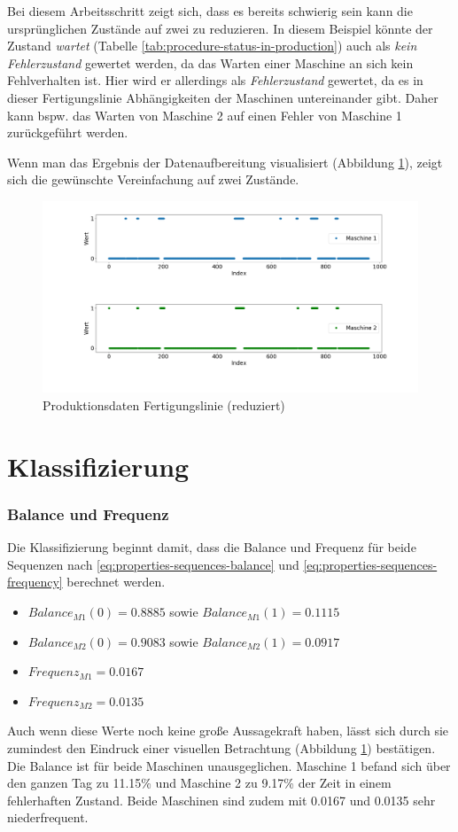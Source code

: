 Bei diesem Arbeitsschritt zeigt sich, dass es bereits schwierig sein kann die ursprünglichen Zustände auf zwei zu reduzieren. In diesem Beispiel könnte der Zustand \textit{wartet} (Tabelle \ref{tab:procedure-status-in-production}) auch als \textit{kein Fehlerzustand} gewertet werden, da das Warten einer Maschine an sich kein Fehlverhalten ist. Hier wird er allerdings als \textit{Fehlerzustand} gewertet, da es in dieser Fertigungslinie Abhängigkeiten der Maschinen untereinander gibt. Daher kann bspw. das Warten von Maschine 2 auf einen Fehler von  Maschine 1 zurückgeführt werden.

Wenn man das Ergebnis der Datenaufbereitung visualisiert (Abbildung \ref{fig:procedure-reduced-data}), zeigt sich die gewünschte Vereinfachung auf zwei Zustände.

\begin{figure}[H]
	\centering
	\includegraphics[scale=0.32]{images/procedure/reduced-data}
	\caption{Produktionsdaten Fertigungslinie (reduziert)}
	\label{fig:procedure-reduced-data}
\end{figure}

\section{Klassifizierung}

\subsubsection{Balance und Frequenz}

Die Klassifizierung beginnt damit, dass die Balance und Frequenz für beide Sequenzen nach \ref{eq:properties-sequences-balance} und \ref{eq:properties-sequences-frequency} berechnet werden.
\begin{itemize}
	\item $Balance_{M1}(0) = 0.8885$ sowie $Balance_{M1}(1) = 0.1115$
	\item $Balance_{M2}(0) = 0.9083$ sowie $Balance_{M2}(1) = 0.0917$
	\item $Frequenz_{M1} = 0.0167$
	\item $Frequenz_{M2} = 0.0135$
\end{itemize}
Auch wenn diese Werte noch keine große Aussagekraft haben, lässt sich durch sie zumindest den Eindruck einer visuellen Betrachtung (Abbildung \ref{fig:procedure-reduced-data}) bestätigen. Die Balance ist für beide Maschinen unausgeglichen. Maschine 1 befand sich über den ganzen Tag zu 11.15\% und Maschine 2 zu 9.17\% der Zeit in einem fehlerhaften Zustand. Beide Maschinen sind zudem mit 0.0167 und 0.0135 sehr niederfrequent.

